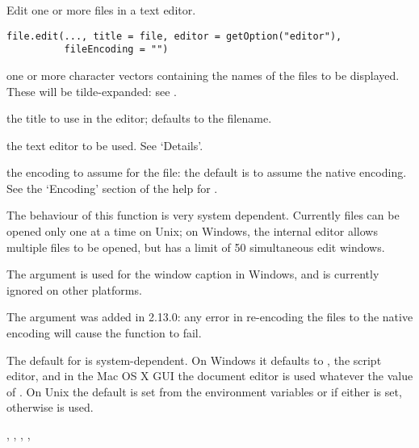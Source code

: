 %
\begin{Description}\relax
Edit one or more files in a text editor.
\end{Description}
%
\begin{Usage}
\begin{verbatim}
file.edit(..., title = file, editor = getOption("editor"),
          fileEncoding = "")
\end{verbatim}
\end{Usage}
%
\begin{Arguments}
\begin{ldescription}
\item[\code{...}] one or more character vectors containing the names of the
files to be displayed.  These will be tilde-expanded: see
.
\item[\code{title}] the title to use in the editor; defaults to the filename. 
\item[\code{editor}] the text editor to be used.  See `Details'.
\item[\code{fileEncoding}] the encoding to assume for the file: the default
is to assume the native encoding.  See the `Encoding' section
of the help for .
\end{ldescription}
\end{Arguments}
%
\begin{Details}\relax
The behaviour of this function is very system dependent.  Currently
files can be opened only one at a time on Unix; on Windows, the
internal editor allows multiple files to be opened, but has a limit of
50 simultaneous edit windows.

The  argument is used for the window caption in Windows,
and is currently ignored on other platforms.

The  argument was added in \R{} 2.13.0: any error in
re-encoding the files to the native encoding will cause the function
to fail.

The default for  is system-dependent.   On
Windows it defaults to , the script editor, and in
the Mac OS X GUI the document editor is used whatever the value of
.  On Unix the default is set from the environment
variables  or  if either is set, otherwise
 is used.
\end{Details}
%
\begin{SeeAlso}\relax
{},
,
,
,
\end{SeeAlso}
